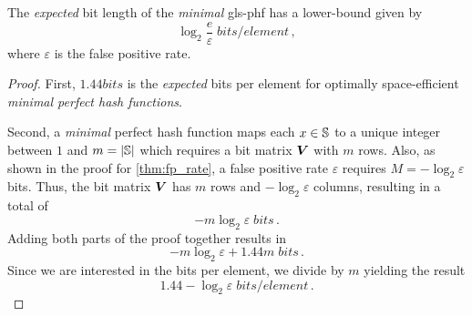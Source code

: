 \documentclass[ ../main.tex]{subfiles}
\begin{document}
\begin{corollary}
The \emph{expected} bit length of the \emph{minimal} \gls{gls-phf} has a lower-bound given by
\begin{equation}
\label{eq:mPHF_size}
    \log_2 \frac{e}{\varepsilon} \; \si{bits \per element}\,,
\end{equation}
where $\varepsilon$ is the false positive rate.
\end{corollary}
\begin{proof}
First, $1.44 \si{bits}$ is the \emph{expected} bits per element for optimally space-efficient \emph{minimal perfect hash functions}.

Second, a \emph{minimal} perfect hash function maps each $x \in \mathbb{S}$ to a unique integer between $1$ and $m=\left\vert{\mathbb{S}}\right\vert$ which requires a bit matrix $\boldsymbol{V}$ with $m$ rows. Also, as shown in the proof for \cref{thm:fp_rate}, a false positive rate $\varepsilon$ requires $M = -\log_2 \varepsilon$ bits. Thus, the bit matrix $\boldsymbol{V}$ has $m$ rows and $-\log_2 \varepsilon$ columns, resulting in a total of
\begin{equation}
    -m \log_2 \varepsilon \; \si{bits}\,.
\end{equation}
Adding both parts of the proof together results in
\begin{equation}
    -m \log_2 \varepsilon + 1.44 m\; \si{bits}\,.
\end{equation}
Since we are interested in the bits per element, we divide by $m$ yielding the result
\begin{equation}
    1.44 - \log_2 \varepsilon\; \si{bits \per element}\,.
\end{equation}
\end{proof}
\end{document}

